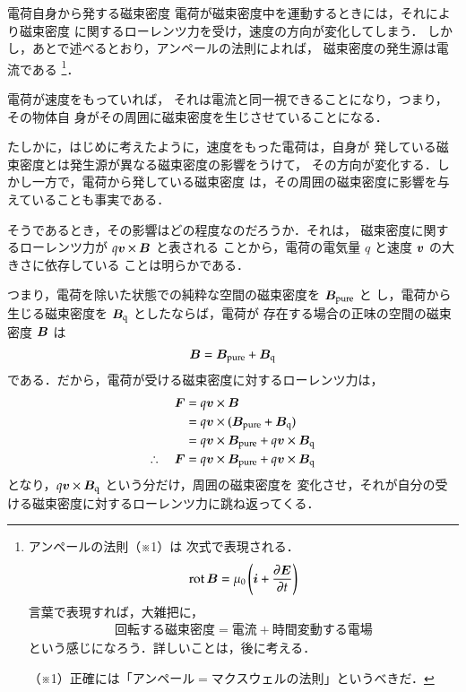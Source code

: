     \begin{memo}{電荷自身から発する磁束密度}
        電荷が磁束密度中を運動するときには，それにより磁束密度
        に関するローレンツ力を受け，速度の方向が変化してしまう．
        しかし，あとで述べるとおり，アンペールの法則によれば，
        磁束密度の発生源は電流である
            \footnote{
                アンペールの法則（※1）は
                次式で表現される．
                \begin{align*}
                    \mathrm{rot}\,\boldsymbol{B} =  \mu_{0}\left(
                                    \boldsymbol{i} + \frac{\partial \boldsymbol{E}}{\partial t}
                                \right)
                \end{align*}
                言葉で表現すれば，大雑把に，
                \begin{align*}
                    \mbox{回転する磁束密度} = \mbox{電流} + \mbox{時間変動する電場}
                \end{align*}
                という感じになろう．詳しいことは，後に考える．

                （※1）正確には「アンペール$=$マクスウェルの法則」というべきだ．
            }．

        電荷が速度をもっていれば，
        それは電流と同一視できることになり，つまり，その物体自
        身がその周囲に磁束密度を生じさせていることになる．

        たしかに，はじめに考えたように，速度をもった電荷は，自身が
        発している磁束密度とは発生源が異なる磁束密度の影響をうけて，
        その方向が変化する．しかし一方で，電荷から発している磁束密度
        は，その周囲の磁束密度に影響を与えていることも事実である．

        そうであるとき，その影響はどの程度なのだろうか．それは，
        磁束密度に関するローレンツ力が $q\boldsymbol{v}\times\boldsymbol{B}$ と表される
        ことから，電荷の電気量 $q$ と速度 $\boldsymbol{v}$ の大きさに依存している
        ことは明らかである．

        つまり，電荷を除いた状態での純粋な空間の磁束密度を $\boldsymbol{B}_{\mathrm{pure}}$ と
        し，電荷から生じる磁束密度を $\boldsymbol{B}_{\mathrm{q}}$ としたならば，電荷が
        存在する場合の正味の空間の磁束密度 $\boldsymbol{B}$ は
            \begin{align*}
                \boldsymbol{B} = \boldsymbol{B}_{\mathrm{pure}} + \boldsymbol{B}_{\mathrm{q}} \\
            \end{align*}
        である．だから，電荷が受ける磁束密度に対するローレンツ力は，
            \begin{align*}
                \boldsymbol{F} &= q \boldsymbol{v} \times \boldsymbol{B} \\
                    &= q \boldsymbol{v} \times (\boldsymbol{B}_{\mathrm{pure}} + \boldsymbol{B}_{\mathrm{q}}) \\
                    &= q \boldsymbol{v} \times  \boldsymbol{B}_{\mathrm{pure}} + q \boldsymbol{v} \times \boldsymbol{B}_{\mathrm{q}} \\
                \therefore\quad
                \boldsymbol{F} &= q \boldsymbol{v} \times  \boldsymbol{B}_{\mathrm{pure}} + q \boldsymbol{v} \times \boldsymbol{B}_{\mathrm{q}}
            \end{align*}
        となり，$q \boldsymbol{v} \times \boldsymbol{B}_{\mathrm{q}}$ という分だけ，周囲の磁束密度を
        変化させ，それが自分の受ける磁束密度に対するローレンツ力に跳ね返ってくる．


\end{memo}
